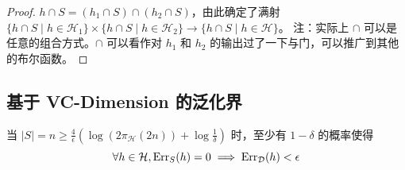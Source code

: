 \begin{proof}
    $h \cap S = (h_1 \cap S) \cap (h_2 \cap S)$，由此确定了满射 $\{h \cap S \mid h \in \mathcal{H}_1\} \times \{h \cap S \mid h \in \mathcal{H}_2\} \rightarrow \{h \cap S \mid h \in \mathcal{H}\}$。
    注：实际上 $\cap$ 可以是任意的组合方式。$\cap$ 可以看作对 $h_1$ 和 $h_2$ 的输出过了一下与门，可以推广到其他的布尔函数。
\end{proof}

\subsection{基于 VC-Dimension 的泛化界}

\begin{theorem}
    当 $|S|=n \ge \frac{4}{\epsilon} \left(\log (2\pi_{\mathcal{H}}(2n)) + \log \frac{1}{\delta}\right)$ 时，至少有 $1-\delta$ 的概率使得
    \[
        \forall h \in \mathcal{H}, \text{Err}_S(h)=0 \implies \text{Err}_{\mathcal{D}}(h) < \epsilon
    \]
\end{theorem}


